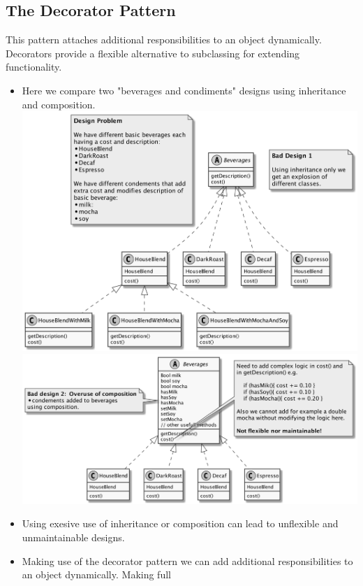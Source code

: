 \documentclass[11pt]{article}
\begin{document}
    \subsection{The Decorator Pattern}
    This pattern attaches additional responsibilities to an object dynamically. Decorators provide a flexible alternative to
    subclassing for extending functionality.
    \begin{itemize}
        \item Here we compare two "beverages and condiments" designs using inheritance and composition.\\
        \includegraphics[scale=0.15]{decorator/1__beverages_bad_design1.png}\\
        \includegraphics[scale=0.15]{decorator/2__beverages_bad_design2.png}
        \item Using exesive use of inheritance or composition can lead to unflexible and unmaintainable designs.
        \item Making use of the decorator pattern we can add additional responsibilities to an object dynamically. Making full

\end{itemize}
\end{document}
